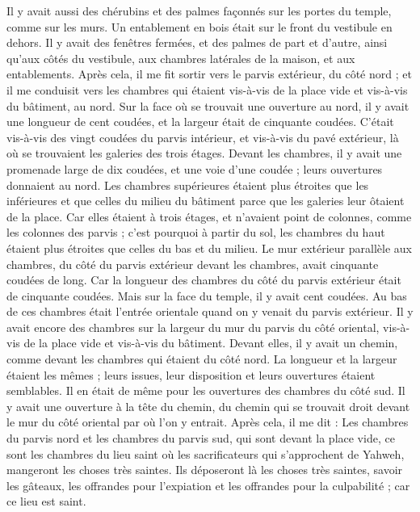 \begin{multicols}{2}
Il y avait aussi des chérubins et des palmes façonnés sur les portes du temple, comme sur les murs. Un entablement en bois était sur le front du vestibule en dehors.
Il y avait des fenêtres fermées, et des palmes de part et d'autre, ainsi qu'aux côtés du vestibule, aux chambres latérales de la maison, et aux entablements.
\VerseOne{}Après cela, il me fit sortir vers le parvis extérieur, du côté nord ; et il me conduisit vers les chambres qui étaient vis-à-vis de la place vide et vis-à-vis du bâtiment, au nord.
Sur la face où se trouvait une ouverture au nord, il y avait une longueur de cent coudées, et la largeur était de cinquante coudées.
C'était vis-à-vis des vingt coudées du parvis intérieur, et vis-à-vis du pavé extérieur, là où se trouvaient les galeries des trois étages.
Devant les chambres, il y avait une promenade large de dix coudées, et une voie d'une coudée ; leurs ouvertures donnaient au nord.
Les chambres supérieures étaient plus étroites que les inférieures et que celles du milieu du bâtiment parce que les galeries leur ôtaient de la place.
Car elles étaient à trois étages, et n'avaient point de colonnes, comme les colonnes des parvis ; c'est pourquoi à partir du sol, les chambres du haut étaient plus étroites que celles du bas et du milieu.
Le mur extérieur parallèle aux chambres, du côté du parvis extérieur devant les chambres, avait cinquante coudées de long.
Car la longueur des chambres du côté du parvis extérieur était de cinquante coudées. Mais sur la face du temple, il y avait cent coudées.
Au bas de ces chambres était l'entrée orientale quand on y venait du parvis extérieur.
Il y avait encore des chambres sur la largeur du mur du parvis du côté oriental, vis-à-vis de la place vide et vis-à-vis du bâtiment.
Devant elles, il y avait un chemin, comme devant les chambres qui étaient du côté nord. La longueur et la largeur étaient les mêmes ; leurs issues, leur disposition et leurs ouvertures étaient semblables.
Il en était de même pour les ouvertures des chambres du côté sud. Il y avait une ouverture à la tête du chemin, du chemin qui se trouvait droit devant le mur du côté oriental par où l'on y entrait.
Après cela, il me dit : Les chambres du parvis nord et les chambres du parvis sud, qui sont devant la place vide, ce sont les chambres du lieu saint où les sacrificateurs qui s'approchent de Yahweh, mangeront les choses très saintes. Ils déposeront là les choses très saintes, savoir les gâteaux, les offrandes pour l'expiation et les offrandes pour la culpabilité ; car ce lieu est saint.

\end{multicols}
